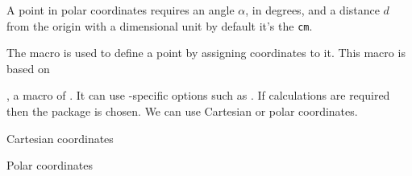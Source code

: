  A point in polar coordinates requires an angle $\alpha$, in degrees,
 and a distance  $d$ from the origin with a dimensional
 unit by default it's the \texttt{cm}.
 
 The  macro is used to define a point by assigning coordinates to it. This macro is based on 
 
 , a macro of \TIKZ. It can use \TIKZ-specific options such as . If calculations are required then the  package is chosen. We can use Cartesian or polar coordinates.
 
\begin{minipage}[t]{0.45\textwidth}
 Cartesian coordinates 
\begin{tkzexample}
\end{tkzexample}%
\end{minipage}
\begin{minipage}[t]{0.45\textwidth}
 Polar coordinates
\begin{tkzexample}
\end{tkzexample}
\end{minipage}%

